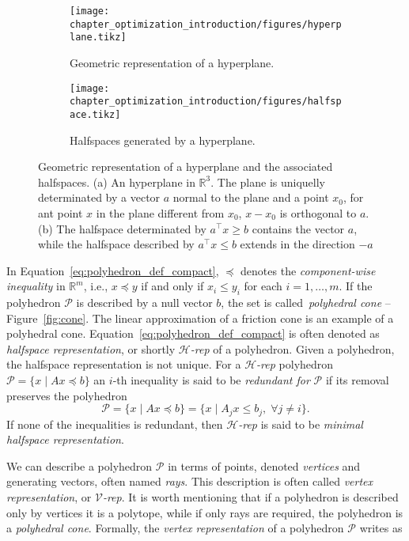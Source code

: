 \begin{figure}[t]
\centering
    \begin{subfigure}[b]{0.48\textwidth}
        \centering
        \texttt{[image: chapter\_optimization\_introduction/figures/hyperplane.tikz]}
        \caption{Geometric representation of a hyperplane.}
        \label{fig:hyperplane}
    \end{subfigure}
    \hfill
    \begin{subfigure}[b]{0.48\textwidth}
        \centering
        \texttt{[image: chapter\_optimization\_introduction/figures/halfspace.tikz]}
        \caption{Halfspaces generated by a hyperplane.}
        \label{fig:halfspace}
    \end{subfigure}
	\caption[A hyperplane and the associated halfspaces]{Geometric representation of a hyperplane and the associated halfspaces. (a) An hyperplane in $\mathbb{R}^3$. The plane is uniquelly determinated by a vector $a$ normal to the plane and a point $x_0$, for ant point $x$ in the plane different from $x_0$, $x - x_0$ is orthogonal to $a$. (b) The halfspace determinated by $a^\top x \ge b$ contains the vector $a$, while the halfspace described by  $a^\top x \le b$ extends in the direction $-a$}
	\label{fig:hyperplane-halfspace}
\end{figure}
In Equation~\eqref{eq:polyhedron_def_compact}, $\preceq$ denotes the \emph{component-wise inequality} in $\mathbb{R}^m$, i.e., $x \preceq y$ if and only if $x_i \le y_i$ for each $i = 1, \dots, m$. If the polyhedron $\mathcal{P}$ is described by a null vector $b$, the set is called~\emph{polyhedral cone} -- Figure~\ref{fig:cone}. The linear approximation of a friction cone is an example of a polyhedral cone. 
Equation~\eqref{eq:polyhedron_def_compact} is often denoted as \emph{halfspace representation}, or shortly $\mathcal{H}$\emph{-rep} of a polyhedron. Given a polyhedron, the halfspace representation is not unique. For a $\mathcal{H}$\emph{-rep} polyhedron $\mathcal{P}=\{ x \; | \; A x \preceq b \}$ an $i$-th inequality is said to be \emph{redundant for} $\mathcal{P}$ if its removal preserves the polyhedron~\citep{Bemporad2001ConvexityPolyhedra}
\begin{equation}
    \mathcal{P}=\{ x \; | \; A x \preceq b \} = \{ x \; | \; A_j x \le b_j, \; \forall j \ne i \}.
\end{equation}
If none of the inequalities is redundant, then $\mathcal{H}$\emph{-rep} is said to be \emph{minimal halfspace representation}. 
\par
We can describe a polyhedron $\mathcal{P}$ in terms of points, denoted \emph{vertices} and generating vectors, often named \emph{rays}. This description is often called \emph{vertex representation}, or $\mathcal{V}$\emph{-rep}. It is worth mentioning that if a polyhedron is described only by vertices it is a polytope, while if only rays are required, the polyhedron is a \emph{polyhedral cone}. Formally, the \emph{vertex representation} of a polyhedron $\mathcal{P}$ writes as
